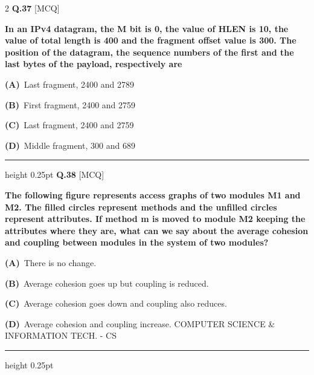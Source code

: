 \documentclass[a4paper,10pt,twoside]{article}
\begin{document}
\begin{multicols}{2}
\noindent\textbf{Q.37} \hfill {\footnotesize\textsf{[MCQ]}}
\par\vspace{2pt}
{\bfseries In an IPv4 datagram, the M bit is 0, the value of HLEN is 10, the value of total length is 400 and
the fragment offset value is 300. The position of the datagram, the sequence numbers of the first
and the last bytes of the payload, respectively are \par}
\par\vspace{2pt}\noindent
\textbf{(A)}~Last fragment, 2400 and 2789\par\vspace{2pt}\noindent
\textbf{(B)}~First fragment, 2400 and 2759\par\vspace{2pt}\noindent
\textbf{(C)}~Last fragment, 2400 and 2759\par\vspace{2pt}\noindent
\textbf{(D)}~Middle fragment, 300 and 689
\par\vspace{6pt}\hrule height 0.25pt\vspace{6pt}
\noindent\textbf{Q.38} \hfill {\footnotesize\textsf{[MCQ]}}
\par\vspace{2pt}
{\bfseries The following figure represents access graphs of two modules M1 and M2. The filled circles
represent methods and the unfilled circles represent attributes. If method m is moved to module M2
keeping the attributes where they are, what can we say about the average cohesion and coupling
between modules in the system of two modules? \par}
\par\vspace{2pt}\noindent
\textbf{(A)}~There is no change.\par\vspace{2pt}\noindent
\textbf{(B)}~Average cohesion goes up but coupling is reduced.\par\vspace{2pt}\noindent
\textbf{(C)}~Average cohesion goes down and coupling also reduces.\par\vspace{2pt}\noindent
\textbf{(D)}~Average cohesion and coupling increase.  COMPUTER SCIENCE \& INFORMATION TECH. - CS
\par\vspace{6pt}\hrule height 0.25pt\vspace{6pt}

\end{multicols}
\end{document}
